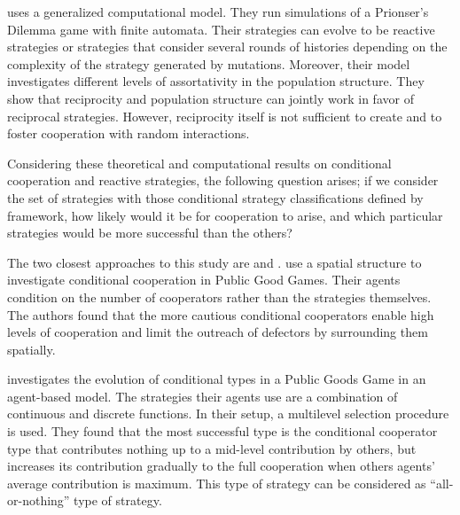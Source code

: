 \documentclass[12pt]{article}
\begin{document}

\citet{Van_Veelen2012-xf} uses a generalized computational model. They run simulations of a Prionser's Dilemma game with finite automata. Their strategies can evolve to be reactive strategies or strategies that consider several rounds of histories depending on the complexity of the strategy generated by mutations. Moreover, their model investigates different levels of assortativity in the population structure. They show that reciprocity and population structure can jointly work in favor of reciprocal strategies. However, reciprocity itself is not sufficient to create and to foster cooperation with random interactions. 

Considering these theoretical and computational results on conditional cooperation and reactive strategies, the following question arises; if we consider the set of strategies with those conditional strategy classifications defined by \citet{Fischbacher2001} framework, how likely would it be for cooperation to arise, and which particular strategies would be more successful than the others?

The two closest approaches to this study are \citet{Szolnoki2012-zq} and \citet{Zhang2016-pz}. \citet{Szolnoki2012-zq} use a spatial structure to investigate conditional cooperation in Public Good Games. Their agents condition on the number of cooperators rather than the strategies themselves. The authors found that the more cautious conditional cooperators enable high levels of cooperation and limit the outreach of defectors by surrounding them spatially.

\citet{Zhang2016-pz} investigates the evolution of conditional types in a Public Goods Game in an agent-based model. The strategies their agents use are a combination of continuous and discrete functions. In their setup, a multilevel selection procedure is used. They found that the most successful type is the conditional cooperator type that contributes nothing up to a mid-level contribution by others, but increases its contribution gradually to the full cooperation when others agents' average contribution is maximum. This type of strategy can be considered as ``all-or-nothing'' type of strategy. 
\end{document}
